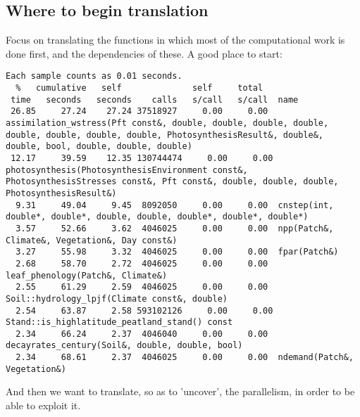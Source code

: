 \subsection{Where to begin translation}
Focus on translating the functions in which most of the computational work is done first, and the dependencies of these. A good place to start:
\begin{verbatim}
Each sample counts as 0.01 seconds.
  %   cumulative   self              self     total
 time   seconds   seconds    calls   s/call   s/call  name
 26.85     27.24    27.24 37518927     0.00     0.00  assimilation_wstress(Pft const&, double, double, double, double, double, double, double, double, PhotosynthesisResult&, double&, double, bool, double, double, double)
 12.17     39.59    12.35 130744474     0.00     0.00  photosynthesis(PhotosynthesisEnvironment const&, PhotosynthesisStresses const&, Pft const&, double, double, double, PhotosynthesisResult&)
  9.31     49.04     9.45  8092050     0.00     0.00  cnstep(int, double*, double*, double, double, double*, double*, double*)
  3.57     52.66     3.62  4046025     0.00     0.00  npp(Patch&, Climate&, Vegetation&, Day const&)
  3.27     55.98     3.32  4046025     0.00     0.00  fpar(Patch&)
  2.68     58.70     2.72  4046025     0.00     0.00  leaf_phenology(Patch&, Climate&)
  2.55     61.29     2.59  4046025     0.00     0.00  Soil::hydrology_lpjf(Climate const&, double)
  2.54     63.87     2.58 593102126     0.00     0.00  Stand::is_highlatitude_peatland_stand() const
  2.34     66.24     2.37  4046040     0.00     0.00  decayrates_century(Soil&, double, double, bool)
  2.34     68.61     2.37  4046025     0.00     0.00  ndemand(Patch&, Vegetation&)
\end{verbatim}
And then we want to translate, so as to 'uncover', the parallelism, in order to be able to exploit it.
